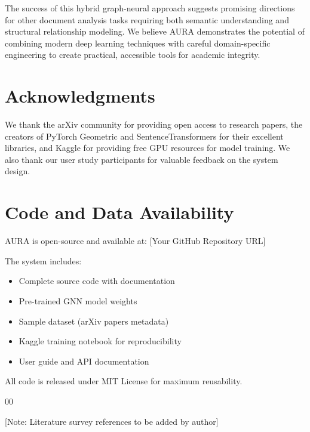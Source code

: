 \documentclass[conference]{IEEEtran}
\begin{document}
The success of this hybrid graph-neural approach suggests promising directions for other document analysis tasks requiring both semantic understanding and structural relationship modeling. We believe AURA demonstrates the potential of combining modern deep learning techniques with careful domain-specific engineering to create practical, accessible tools for academic integrity.

\section*{Acknowledgments}

We thank the arXiv community for providing open access to research papers, the creators of PyTorch Geometric and SentenceTransformers for their excellent libraries, and Kaggle for providing free GPU resources for model training. We also thank our user study participants for valuable feedback on the system design.

\section*{Code and Data Availability}

AURA is open-source and available at: [Your GitHub Repository URL]

The system includes:
\begin{itemize}
    \item Complete source code with documentation
    \item Pre-trained GNN model weights
    \item Sample dataset (arXiv papers metadata)
    \item Kaggle training notebook for reproducibility
    \item User guide and API documentation
\end{itemize}

All code is released under MIT License for maximum reusability.

\begin{thebibliography}{00}


[Note: Literature survey references to be added by author]

\end{thebibliography}
\end{document}
